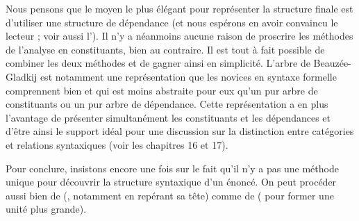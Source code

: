 Nous pensons que le moyen le plus élégant pour représenter la structure finale est d’utiliser une structure de dépendance (et nous espérons en avoir convaincu le lecteur ; voir aussi l’). Il n’y a néanmoins aucune raison de proscrire les méthodes de l’analyse en constituants, bien au contraire. Il est tout à fait possible de combiner les deux méthodes et de gagner ainsi en simplicité. L’arbre de Beauzée-Gladkij est notamment une représentation que les novices en syntaxe formelle comprennent bien et qui est moins abstraite pour eux qu’un pur arbre de constituants ou un pur arbre de dépendance. Cette représentation a en plus l’avantage de présenter simultanément les constituants et les dépendances et d’être ainsi le support idéal pour une discussion sur la distinction entre catégories et relations syntaxiques (voir les chapitres 16 et 17). %

Pour conclure, insistons encore une fois sur le fait qu’il n’y a pas une méthode unique pour découvrir la structure syntaxique d’un énoncé. On peut procéder aussi bien de  (, notamment en repérant sa tête) comme de  ( pour former une unité plus grande).\largerpage


